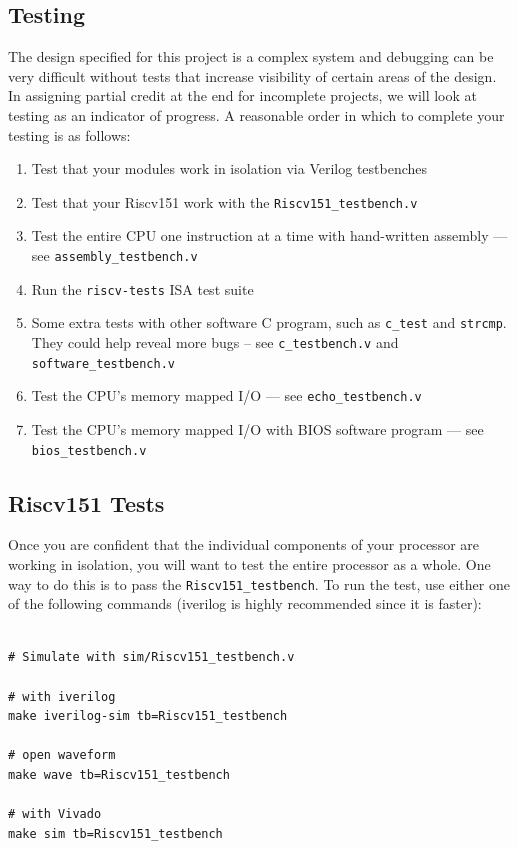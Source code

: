 \documentclass[11pt]{article}
\begin{document}
\subsection{Testing}
\label{testing}
The design specified for this project is a complex system and debugging can be very difficult without tests that increase visibility of certain areas of the design.
In assigning partial credit at the end for incomplete projects, we will look at testing as an indicator of progress.
A reasonable order in which to complete your testing is as follows:

\begin{enumerate}
  \item Test that your modules work in isolation via Verilog testbenches
  \item Test that your Riscv151 work with the \verb|Riscv151_testbench.v|
  \item Test the entire CPU one instruction at a time with hand-written assembly --- see \verb|assembly_testbench.v|
  \item Run the \verb|riscv-tests| ISA test suite
  \item Some extra tests with other software C program, such as \verb|c_test| and \verb|strcmp|. They could help reveal more bugs -- see \verb|c_testbench.v| and \verb|software_testbench.v|
  \item Test the CPU's memory mapped I/O --- see \verb|echo_testbench.v|
  \item Test the CPU's memory mapped I/O with BIOS software program --- see \verb|bios_testbench.v|
\end{enumerate}

\subsection{Riscv151 Tests}

Once you are confident that the individual components of your processor are working in isolation, you will want to test the entire processor as a whole. One way to do this is to pass the \verb|Riscv151_testbench|. To run the test, use either one of the following commands (iverilog is highly recommended since it is faster):\\
\begin{verbatim}

# Simulate with sim/Riscv151_testbench.v

# with iverilog
make iverilog-sim tb=Riscv151_testbench

# open waveform
make wave tb=Riscv151_testbench

# with Vivado
make sim tb=Riscv151_testbench

\end{verbatim}
\end{document}
